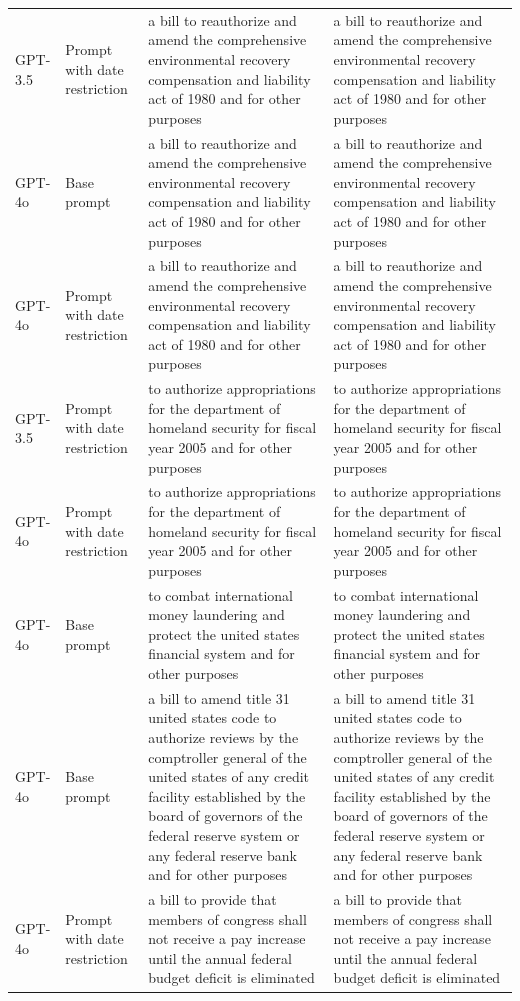 \begin{longtable}{>{\raggedright\arraybackslash}p{1.4cm}>{\raggedright\arraybackslash}p{1.4cm}>{\raggedright\arraybackslash}p{5.5cm}>{\raggedright\arraybackslash}p{5.5cm}}
GPT-3.5 & Prompt with date restriction & a bill to reauthorize and amend the comprehensive environmental recovery compensation and liability act of 1980 and for other purposes & a bill to reauthorize and amend the comprehensive environmental recovery compensation and liability act of 1980 and for other purposes\\
GPT-4o & Base prompt & a bill to reauthorize and amend the comprehensive environmental recovery compensation and liability act of 1980 and for other purposes & a bill to reauthorize and amend the comprehensive environmental recovery compensation and liability act of 1980 and for other purposes\\
GPT-4o & Prompt with date restriction & a bill to reauthorize and amend the comprehensive environmental recovery compensation and liability act of 1980 and for other purposes & a bill to reauthorize and amend the comprehensive environmental recovery compensation and liability act of 1980 and for other purposes\\
GPT-3.5 & Prompt with date restriction & to authorize appropriations for the department of homeland security for fiscal year 2005 and for other purposes & to authorize appropriations for the department of homeland security for fiscal year 2005 and for other purposes\\
GPT-4o & Prompt with date restriction & to authorize appropriations for the department of homeland security for fiscal year 2005 and for other purposes & to authorize appropriations for the department of homeland security for fiscal year 2005 and for other purposes\\
GPT-4o & Base prompt & to combat international money laundering and protect the united states financial system and for other purposes & to combat international money laundering and protect the united states financial system and for other purposes\\
GPT-4o & Base prompt & a bill to amend title 31 united states code to authorize reviews by the comptroller general of the united states of any credit facility established by the board of governors of the federal reserve system or any federal reserve bank and for other purposes & a bill to amend title 31 united states code to authorize reviews by the comptroller general of the united states of any credit facility established by the board of governors of the federal reserve system or any federal reserve bank and for other purposes\\
GPT-4o & Prompt with date restriction & a bill to provide that members of congress shall not receive a pay increase until the annual federal budget deficit is eliminated & a bill to provide that members of congress shall not receive a pay increase until the annual federal budget deficit is eliminated\\

\end{longtable}
